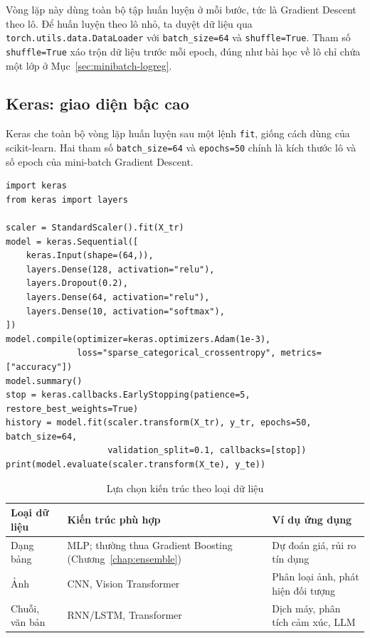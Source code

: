 Vòng lặp này dùng toàn bộ tập huấn luyện ở mỗi bước, tức là Gradient Descent theo lô. Để huấn luyện theo lô nhỏ, ta duyệt dữ liệu qua \texttt{torch.utils.data.DataLoader} với \texttt{batch\_size=64} và \texttt{shuffle=True}. Tham số \texttt{shuffle=True} xáo trộn dữ liệu trước mỗi epoch, đúng như bài học về lô chỉ chứa một lớp ở Mục~\ref{sec:minibatch-logreg}.

\subsection{Keras: giao diện bậc cao}

Keras che toàn bộ vòng lặp huấn luyện sau một lệnh \texttt{fit}, giống cách dùng của scikit-learn. Hai tham số \texttt{batch\_size=64} và \texttt{epochs=50} chính là kích thước lô và số epoch của mini-batch Gradient Descent.

\begin{lstlisting}[caption={Cùng bài toán digits với Keras}]
import keras
from keras import layers

scaler = StandardScaler().fit(X_tr)
model = keras.Sequential([
    keras.Input(shape=(64,)),
    layers.Dense(128, activation="relu"),
    layers.Dropout(0.2),
    layers.Dense(64, activation="relu"),
    layers.Dense(10, activation="softmax"),
])
model.compile(optimizer=keras.optimizers.Adam(1e-3),
              loss="sparse_categorical_crossentropy", metrics=["accuracy"])
model.summary()
stop = keras.callbacks.EarlyStopping(patience=5, restore_best_weights=True)
history = model.fit(scaler.transform(X_tr), y_tr, epochs=50, batch_size=64,
                    validation_split=0.1, callbacks=[stop])
print(model.evaluate(scaler.transform(X_te), y_te))
\end{lstlisting}

\begin{table}[H]
\centering
\begin{tabular}{|p{3.2cm}|p{4.8cm}|p{4.8cm}|}
\hline
\textbf{Loại dữ liệu} & \textbf{Kiến trúc phù hợp} & \textbf{Ví dụ ứng dụng} \\
\hline
Dạng bảng & MLP; thường thua Gradient Boosting (Chương~\ref{chap:ensemble}) & Dự đoán giá, rủi ro tín dụng \\ \hline
Ảnh & CNN, Vision Transformer & Phân loại ảnh, phát hiện đối tượng \\ \hline
Chuỗi, văn bản & RNN/LSTM, Transformer & Dịch máy, phân tích cảm xúc, LLM \\ \hline
\end{tabular}
\caption{Lựa chọn kiến trúc theo loại dữ liệu}
\end{table}

